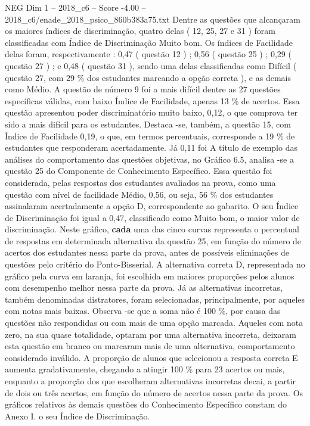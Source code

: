 \begin{textsample}{NEG Dim 1 – 2018\_c6 – Score -4.00 – 2018\_c6/enade\_2018\_psico\_860b383a75.txt}
Dentre as questões que alcançaram os maiores índices de discriminação, quatro delas ( 12, 25, 27 e 31 ) foram classificadas com Índice de Discriminação Muito bom.
Os índices de Facilidade delas foram, respectivamente : 0,47 ( questão 12 ) ; 0,56 ( questão 25 ) ; 0,29 ( questão 27 ) ; e 0,48 ( questão 31 ), sendo uma delas classificadas como Difícil ( questão 27, com 29 \% dos estudantes marcando a opção correta ), e as demais como Médio.
A questão de número 9 foi a mais difícil dentre as 27 questões específicas válidas, com baixo Índice de Facilidade, apenas 13 \% de acertos.
Essa questão apresentou poder discriminatório muito baixo, 0,12, o que comprova ter sido a mais difícil para os estudantes.
Destaca -se, também, a questão 15, com Índice de Facilidade 0,19, o que, em termos percentuais, corresponde a 19 \% de estudantes que responderam acertadamente.
Já 0,11 foi A título de exemplo das análises do comportamento das questões objetivas, no Gráfico 6.5, analisa -se a questão 25 do Componente de Conhecimento Específico.
Essa questão foi considerada, pelas respostas dos estudantes avaliados na prova, como uma questão com nível de facilidade Médio, 0,56, ou seja, 56 \% dos estudantes assinalaram acertadamente a opção D, correspondente ao gabarito.
O seu Índice de Discriminação foi igual a 0,47, classificado como Muito bom, o maior valor de discriminação.
Neste gráfico, \textbf{cada} uma das cinco curvas representa o percentual de respostas em determinada alternativa da questão 25, em função do número de acertos dos estudantes nessa parte da prova, antes de possíveis eliminações de questões pelo critério do Ponto-Bisserial.
A alternativa correta D, representada no gráfico pela curva em laranja, foi escolhida em maiores proporções pelos alunos com desempenho melhor nessa parte da prova.
Já as alternativas incorretas, também denominadas distratores, foram selecionadas, principalmente, por aqueles com notas mais baixas.
Observa -se que a soma não é 100 \%, por causa das questões não respondidas ou com mais de uma opção marcada.
Aqueles com nota zero, na sua quase totalidade, optaram por uma alternativa incorreta, deixaram esta questão em branco ou marcaram mais de uma alternativa, comportamento considerado inválido.
A proporção de alunos que selecionou a resposta correta E aumenta gradativamente, chegando a atingir 100 \% para 23 acertos ou mais, enquanto a proporção dos que escolheram alternativas incorretas decai, a partir de dois ou três acertos, em função do número de acertos nessa parte da prova.
Os gráficos relativos às demais questões do Conhecimento Específico constam do Anexo I. o seu Índice de Discriminação.

\end{textsample}
